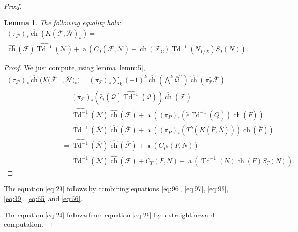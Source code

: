 \documentclass[10pt,twoside]{article}
\numberwithin{equation}{section}
\theoremstyle{plain}
\newtheorem{lemma}[equation]{Lemma}
\theoremstyle{definition}
\DeclareMathOperator{\Td}{Td}
\DeclareMathOperator{\ch}{ch}
\DeclareMathOperator{\amap}{a}
\newcommand{\CC}{{\mathbb C}}
\begin{document}
\begin{proof}
    \begin{lemma}
      The following equality hold:
       \begin{multline}\label{eq:56}
        (\pi _{\mathcal{P}})_{\ast}
        \widehat{\ch}(K(\overline{\mathcal{F}},\overline{\mathcal{N}})_{\ast})=\\
        \widehat{\ch}(\overline{\mathcal{F}})
        \widehat{\Td^{-1}}(\overline{\mathcal{N}})
        +\amap(C_{T}(\overline{\mathcal{F}},\overline{\mathcal{N}})-
        \ch(\mathcal{F}_{\CC})
        \Td^{-1}(N_{Y/X})S_{T}(N)). 
      \end{multline}
    \end{lemma}
    \begin{proof}
      We just compute, using lemma \ref{lemm:5},
      \begin{align*}
                (\pi _{\mathcal{P}})_{\ast}
        \widehat{\ch}(K(\overline{\mathcal{F}}&,\overline{\mathcal{N}})_{\ast})=
         (\pi _{\mathcal{P}})_{\ast}\sum_{k}(-1)^{k}
         \widehat {\ch}(\bigwedge^{k}\overline {\mathcal{Q}}^{\vee})
         \widehat {\ch}(\pi _{\mathcal{P}}^{\ast}\overline
         {\mathcal{F}})\\&=
         (\pi _{\mathcal{P}})_{\ast}(\widehat
         c_{r}(\overline{\mathcal{Q}})
         \widehat{\Td^{-1}}(\overline{\mathcal{Q}}))
         \widehat{\ch}(\overline{\mathcal{F}})\\  
         &=
         \widehat{\Td^{-1}}(\overline{\mathcal{N}})
         \widehat{\ch}(\overline{\mathcal{F}})+
         \amap((\pi _{P})_{\ast}(\widetilde e \Td^{-1}(\overline
         {Q}))\ch(\overline F))\\
         &=\widehat{\Td^{-1}}(\overline{\mathcal{N}})
         \widehat{\ch}(\overline{\mathcal{F}})
         +
         \amap((\pi _{P})_{\ast}(T^{h}(K(\overline F,\overline N)))
         \ch(\overline F))\\
         &=\widehat{\Td^{-1}}(\overline{\mathcal{N}})
         \widehat{\ch}(\overline{\mathcal{F}})
         +\amap(C_{T^{h}}(F,N))\\
         &=\widehat{\Td^{-1}}(\overline{\mathcal{N}})
         \widehat{\ch}(\overline{\mathcal{F}})
         +C_{T}(F,N)-\amap(\Td^{-1}(N)\ch(F)S_{T}(N)).
      \end{align*}
    \end{proof}
    The equation \eqref{eq:29} follows by combining equations
    \eqref{eq:96}, \eqref{eq:97}, \eqref{eq:98}, \eqref{eq:99},
    \eqref{eq:65} and \eqref{eq:56}.
    
    The equation \eqref{eq:24} follows from equation \eqref{eq:29} by
    a straightforward computation.
\end{proof}
\end{document}
